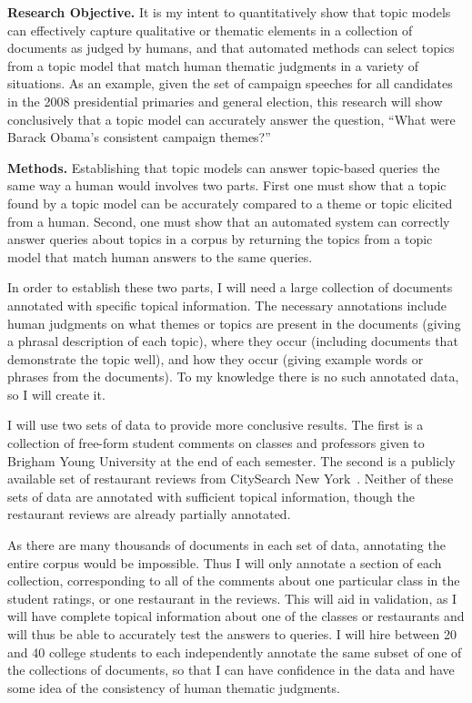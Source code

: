 \documentclass[onecolumn, 12pt]{article}
\begin{document}
\textbf{Research Objective.}  It is my intent to quantitatively show that topic
models can effectively capture qualitative or thematic elements in a collection
of documents as judged by humans, and that automated methods can select topics
from a topic model that match human thematic judgments in a variety of
situations.  As an example, given the set of campaign speeches for all
candidates in the 2008 presidential primaries and general election, this
research will show conclusively that a topic model can accurately answer the
question, ``What were Barack Obama's consistent campaign themes?''

\textbf{Methods.}  Establishing that topic models can answer topic-based
queries the same way a human would involves two parts.  First one must show
that a topic found by a topic model can be accurately compared to a theme or
topic elicited from a human.  Second, one must show that an automated system
can correctly answer queries about topics in a corpus by returning the topics
from a topic model that match human answers to the same queries.

In order to establish these two parts, I will need a large collection of
documents annotated with specific topical information.  The necessary
annotations include human judgments on what themes or topics are present in the
documents (giving a phrasal description of each topic), where they occur
(including documents that demonstrate the topic well), and how they occur
(giving example words or phrases from the documents).  To my knowledge there is
no such annotated data, so I will create it.  

I will use two sets of data to provide more conclusive results.  The first is a
collection of free-form student comments on classes and professors given to
Brigham Young University at the end of each semester.  The second is a publicly
available set of restaurant reviews from CitySearch New
York~\cite{ganu-2009-restaurant-ratings}.  Neither of these sets of data are
annotated with sufficient topical information, though the restaurant reviews
are already partially annotated.

As there are many thousands of documents in each set of data, annotating the
entire corpus would be impossible.  Thus I will only annotate a section of each
collection, corresponding to all of the comments about one particular class in
the student ratings, or one restaurant in the reviews.  This will aid in
validation, as I will have complete topical information about one of the
classes or restaurants and will thus be able to accurately test the answers to
queries.  I will hire between 20 and 40 college students to each independently
annotate the same subset of one of the collections of documents, so that I can
have confidence in the data and have some idea of the consistency of human
thematic judgments.
\end{document}
